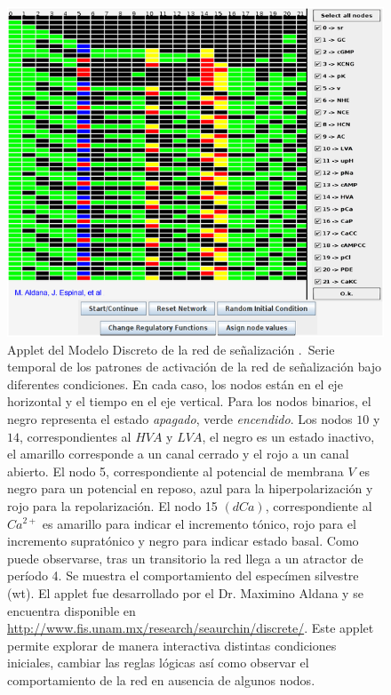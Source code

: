 \begin{figure}[hbt]
\includegraphics[width=0.9\linewidth%
]{gfx/appletErizo}
\caption[Applet del Modelo Discreto]{Applet del Modelo Discreto de la red de se\~nalizaci\'on \citeauthor{Espinal2011} \citep{Espinal2011}.\ Serie temporal de los patrones de activación de la red de señalización bajo diferentes condiciones. En cada caso, los nodos están en el eje horizontal y el tiempo en el eje vertical. Para los nodos binarios, el negro representa el estado \emph{apagado}, verde \emph{encendido}. Los nodos $10$ y $14$, correspondientes al $HVA$ y $LVA$, el negro es un estado inactivo, el amarillo corresponde a un canal cerrado y el rojo a un canal abierto. El nodo 5, correspondiente al potencial de membrana $V$ es negro para un potencial en reposo, azul para la hiperpolarización y rojo para la repolarización. El nodo 15 $(dCa)$, correspondiente al $Ca^{2+}$ es amarillo para indicar el incremento tónico, rojo para el incremento supratónico y negro para indicar estado basal. Como puede observarse, tras un transitorio la red llega a un atractor de período 4. Se muestra el comportamiento del especímen silvestre (wt).
El applet fue desarrollado por el Dr. Maximino Aldana y se encuentra disponible en \url{http://www.fis.unam.mx/research/seaurchin/discrete/}. Este applet permite explorar de manera interactiva distintas condiciones iniciales, cambiar las reglas lógicas así como observar el comportamiento de la red en ausencia de algunos nodos.}\label{fig:appletErizo}
\end{figure}

